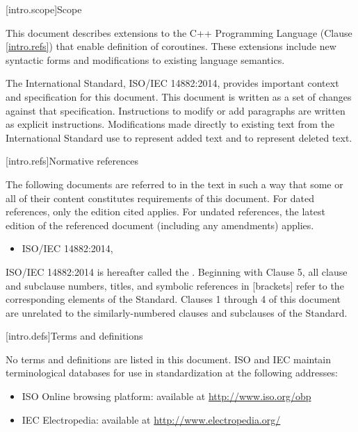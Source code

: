 
[intro.scope]{Scope}

\pnum
This document describes extensions to the C++ 
Programming Language (Clause \ref{intro.refs}) that
enable definition of coroutines. These extensions include 
new syntactic forms and modifications to existing language semantics.

\pnum
The International Standard, ISO/IEC 14882:2014, provides important context
and specification for this document. This document is 
written as a set of changes against that specification. Instructions
to modify or add paragraphs are written as explicit instructions. 
Modifications made directly to existing text from the International
Standard use  to represent added text and
 to represent deleted text. 

[intro.refs]{Normative references}

\pnum
The following documents are referred to in the text in such a way that some or all of their content constitutes requirements of this document. For dated references, only the edition cited applies. For undated references, the latest edition of the referenced document (including any amendments) applies.

\begin{itemize}
	\item ISO/IEC 14882:2014, 
\end{itemize}

ISO/IEC 14882:2014 is hereafter called the .
%
Beginning with Clause 5, all clause and subclause numbers, titles,
and symbolic references in [brackets] refer to the corresponding elements of the \Cpp Standard. Clauses 1 through 4 of this document
are unrelated to the similarly-numbered clauses and subclauses of the \Cpp Standard.


[intro.defs]{Terms and definitions}

No terms and definitions are listed in this document.
ISO and IEC maintain terminological databases for use in standardization at the following addresses:

\begin{itemize}
	\item ISO Online browsing platform: available at \url{http://www.iso.org/obp}
	\item IEC Electropedia: available at \url{http://www.electropedia.org/}
\end{itemize}

